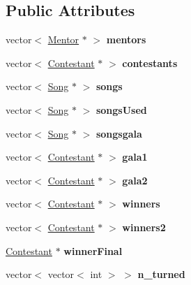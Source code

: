 \subsection*{Public Attributes}
\begin{DoxyCompactItemize}
\item 
\hypertarget{class_season_a4ca1bce19b8580200c0167d96cee018c}{}\label{class_season_a4ca1bce19b8580200c0167d96cee018c} 
vector$<$ \hyperlink{class_mentor}{Mentor} $\ast$ $>$ {\bfseries mentors}
\item 
\hypertarget{class_season_a2de1b335b3522e39876af68fd5213b02}{}\label{class_season_a2de1b335b3522e39876af68fd5213b02} 
vector$<$ \hyperlink{class_contestant}{Contestant} $\ast$ $>$ {\bfseries contestants}
\item 
\hypertarget{class_season_a9d6961338fb4af9426690d7d8b4cf596}{}\label{class_season_a9d6961338fb4af9426690d7d8b4cf596} 
vector$<$ \hyperlink{class_song}{Song} $\ast$ $>$ {\bfseries songs}
\item 
\hypertarget{class_season_aa3b7319b5e5ecfb4c41a40b4bedc09b1}{}\label{class_season_aa3b7319b5e5ecfb4c41a40b4bedc09b1} 
vector$<$ \hyperlink{class_song}{Song} $\ast$ $>$ {\bfseries songs\+Used}
\item 
\hypertarget{class_season_ac48fde0f957e3656a0b3463928d97dbd}{}\label{class_season_ac48fde0f957e3656a0b3463928d97dbd} 
vector$<$ \hyperlink{class_song}{Song} $\ast$ $>$ {\bfseries songsgala}
\item 
\hypertarget{class_season_ac464dcab5c001adf75c058374e77169c}{}\label{class_season_ac464dcab5c001adf75c058374e77169c} 
vector$<$ \hyperlink{class_contestant}{Contestant} $\ast$ $>$ {\bfseries gala1}
\item 
\hypertarget{class_season_a506f613439c6a7c5ad72e8cfd79e2d61}{}\label{class_season_a506f613439c6a7c5ad72e8cfd79e2d61} 
vector$<$ \hyperlink{class_contestant}{Contestant} $\ast$ $>$ {\bfseries gala2}
\item 
\hypertarget{class_season_a493540757b4629ca3575154be5caf403}{}\label{class_season_a493540757b4629ca3575154be5caf403} 
vector$<$ \hyperlink{class_contestant}{Contestant} $\ast$ $>$ {\bfseries winners}
\item 
\hypertarget{class_season_ad583038e1e0f10bca45264ba18276a04}{}\label{class_season_ad583038e1e0f10bca45264ba18276a04} 
vector$<$ \hyperlink{class_contestant}{Contestant} $\ast$ $>$ {\bfseries winners2}
\item 
\hypertarget{class_season_a4092b82e190e4689b9bb3be1d5f515cf}{}\label{class_season_a4092b82e190e4689b9bb3be1d5f515cf} 
\hyperlink{class_contestant}{Contestant} $\ast$ {\bfseries winner\+Final}
\item 
\hypertarget{class_season_a3ddf3dcac18b32a5de00cf6dd010cc1b}{}\label{class_season_a3ddf3dcac18b32a5de00cf6dd010cc1b} 
vector$<$ vector$<$ int $>$ $>$ {\bfseries n\+\_\+turned}
\end{DoxyCompactItemize}


